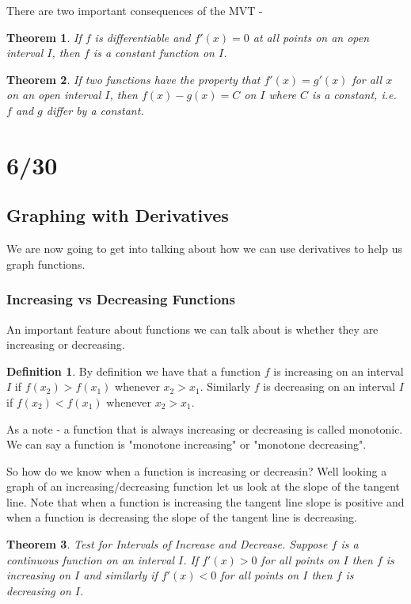 \documentclass[12pt,reqno]{article}
\newtheorem{Theorem}{Theorem}
\theoremstyle{definition}
\newtheorem*{Definition}{Definition}
\begin{document}
There are two important consequences of the MVT - 
\begin{Theorem}
	If $f$ is differentiable and $f'(x) = 0$ at all points on an open interval $I$, then $f$ is a constant function on $I$. 
\end{Theorem}

\begin{Theorem}
	If two functions have the property that $f'(x) = g'(x)$ for all $x$ on an open interval $I$, then $f(x) - g(x) = C$ on $I$ where $C$ is a constant, i.e. $f$ and $g$ differ by a constant. 
\end{Theorem}

\section{6/30}
\subsection{Graphing with Derivatives}
We are now going to get into talking about how we can use derivatives to help us graph functions. 
\subsubsection{Increasing vs Decreasing Functions} 

An important feature about functions we can talk about is whether they are increasing or decreasing. 
\begin{Definition}
By definition we have that a function $f$ is increasing on an interval $I$ if $f(x_2) > f(x_1)$ whenever $x_2 > x_1$. Similarly $f$ is decreasing on an interval $I$ if $f(x_2) < f(x_1)$ whenever $x_2 > x_1$. 
\end{Definition}

As a note - a function that is always increasing or decreasing is called monotonic. We can say a function is "monotone increasing" or "monotone decreasing". 

So how do we know when a function is increasing or decreasin? Well looking a graph of an increasing/decreasing function let us look at the slope of the tangent line. Note that when a function is increasing the tangent line slope is positive and when a function is decreasing the slope of the tangent line is decreasing. 

\begin{Theorem}
Test for Intervals of Increase and Decrease. Suppose $f$ is a continuous function on an interval $I$. If $f'(x) > 0$ for all points on $I$ then $f$ is increasing on $I$ and similarly if $f'(x) < 0$ for all points on $I$ then $f$ is decreasing on $I$. 
\end{Theorem}
\end{document}
